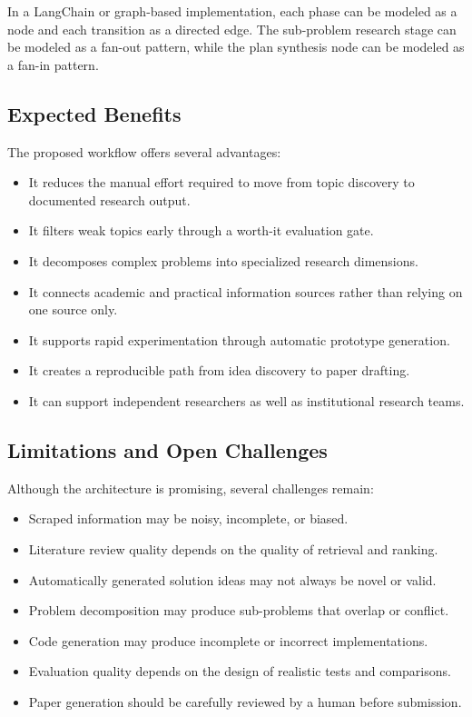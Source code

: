 \documentclass[11pt,a4paper]{article}
\begin{document}
In a LangChain or graph-based implementation, each phase can be modeled as a node and each transition as a directed edge. The sub-problem research stage can be modeled as a fan-out pattern, while the plan synthesis node can be modeled as a fan-in pattern.

\subsection{Expected Benefits}

The proposed workflow offers several advantages:

\begin{itemize}
    \item It reduces the manual effort required to move from topic discovery to documented research output.
    \item It filters weak topics early through a worth-it evaluation gate.
    \item It decomposes complex problems into specialized research dimensions.
    \item It connects academic and practical information sources rather than relying on one source only.
    \item It supports rapid experimentation through automatic prototype generation.
    \item It creates a reproducible path from idea discovery to paper drafting.
    \item It can support independent researchers as well as institutional research teams.
\end{itemize}

\subsection{Limitations and Open Challenges}

Although the architecture is promising, several challenges remain:

\begin{itemize}
    \item Scraped information may be noisy, incomplete, or biased.
    \item Literature review quality depends on the quality of retrieval and ranking.
    \item Automatically generated solution ideas may not always be novel or valid.
    \item Problem decomposition may produce sub-problems that overlap or conflict.
    \item Code generation may produce incomplete or incorrect implementations.
    \item Evaluation quality depends on the design of realistic tests and comparisons.
    \item Paper generation should be carefully reviewed by a human before submission.
\end{itemize}
\end{document}
